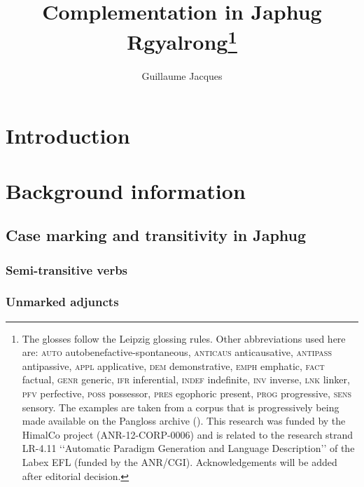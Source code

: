 \documentclass[oneside,a4paper,11pt]{article}
\begin{document}
 

\title{Complementation in Japhug Rgyalrong\footnote{The glosses follow the Leipzig glossing rules. Other abbreviations used here are: \textsc{auto}  autobenefactive-spontaneous, \textsc{anticaus} anticausative, \textsc{antipass} antipassive, \textsc{appl} applicative, \textsc{dem} demonstrative,  \textsc{emph} emphatic, \textsc{fact} factual, \textsc{genr} generic, \textsc{ifr} inferential, \textsc{indef} indefinite, \textsc{inv} inverse,  \textsc{lnk} linker, \textsc{pfv} perfective, \textsc{poss} possessor, \textsc{pres} egophoric present, \textsc{prog} progressive, \textsc{sens} sensory. The examples are taken from a corpus that is progressively being made available on the Pangloss archive (\citealt{michailovsky14pangloss}). This research was funded by the HimalCo project (ANR-12-CORP-0006) and is related to the research strand LR-4.11 ‘‘Automatic Paradigm Generation and Language Description’’ of the Labex EFL (funded by the ANR/CGI). Acknowledgements   will be added after editorial decision.}} 
\author{Guillaume Jacques}
\maketitle
\linenumbers
 
 
\section{Introduction}
 \citet[9]{dixon06complementation}
 \citet{sun12complementation}
 \citet{jacques08}

\section{Background information}

\subsection{Case marking and transitivity in Japhug} \label{sec:transitivity}


\subsubsection{Semi-transitive verbs}

\subsubsection{Unmarked adjuncts} \label{sec:adjuncts}
\end{document}
